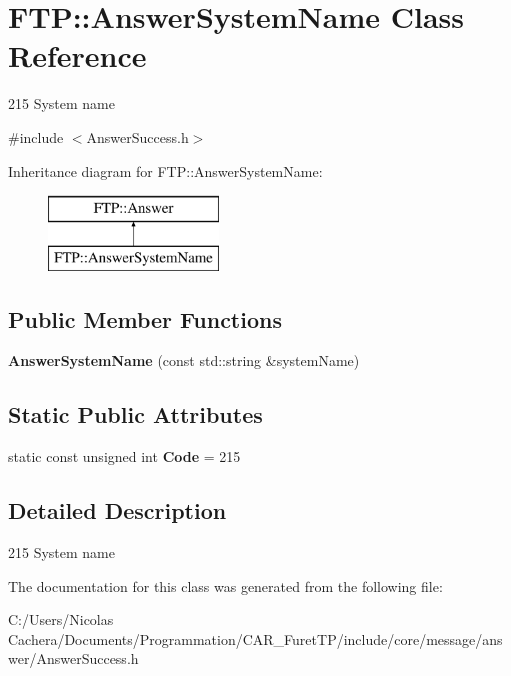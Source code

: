 \hypertarget{classFTP_1_1AnswerSystemName}{}\section{F\+T\+P\+:\+:Answer\+System\+Name Class Reference}
\label{classFTP_1_1AnswerSystemName}


215 System name  




{\ttfamily \#include $<$Answer\+Success.\+h$>$}

Inheritance diagram for F\+T\+P\+:\+:Answer\+System\+Name\+:\begin{figure}[H]
\begin{center}
\leavevmode
\includegraphics[height=2.000000cm]{classFTP_1_1AnswerSystemName}
\end{center}
\end{figure}
\subsection*{Public Member Functions}
\begin{DoxyCompactItemize}
\item 
\hypertarget{classFTP_1_1AnswerSystemName_a435757c81d82db47f1935c241c906023}{}{\bfseries Answer\+System\+Name} (const std\+::string \&system\+Name)\label{classFTP_1_1AnswerSystemName_a435757c81d82db47f1935c241c906023}

\end{DoxyCompactItemize}
\subsection*{Static Public Attributes}
\begin{DoxyCompactItemize}
\item 
\hypertarget{classFTP_1_1AnswerSystemName_af8ce22730f7209c5c72d3827fe6eb3b3}{}static const unsigned int {\bfseries Code} = 215\label{classFTP_1_1AnswerSystemName_af8ce22730f7209c5c72d3827fe6eb3b3}

\end{DoxyCompactItemize}


\subsection{Detailed Description}
215 System name 

The documentation for this class was generated from the following file\+:\begin{DoxyCompactItemize}
\item 
C\+:/\+Users/\+Nicolas Cachera/\+Documents/\+Programmation/\+C\+A\+R\+\_\+\+Furet\+T\+P/include/core/message/answer/Answer\+Success.\+h\end{DoxyCompactItemize}
